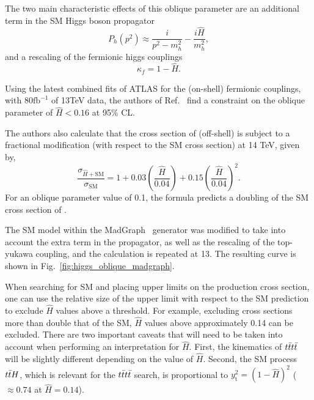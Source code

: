 The two main characteristic effects of this oblique parameter are
an additional term in the SM Higgs boson propagator
\begin{equation}
    P_h(p^2)\approx\frac{i}{p^2-m_h^2}-\frac{i\hat{H}}{m_h^2},
\end{equation}
and a rescaling of the fermionic higgs
couplings
\begin{equation}
    \kappa_f = 1-{\hat H}.
\end{equation}

Using the latest combined fits of ATLAS for the (on-shell) fermionic couplings,
with 80$\mathrm{fb}^{-1}$ of 13TeV data, the authors of Ref.~\cite{THEORY:ObliqueHiggs2019} find a constraint on
the oblique parameter of $\hat{H} < 0.16$ at 95\% CL.

The authors also calculate that the cross section of (off-shell) \tttt is subject to a fractional modification (with respect to the SM cross section)
at 14 TeV, given by,
\begin{equation}
    \frac{\sigma_{\hat{H}+\mathrm{SM}}}{\sigma_\mathrm{SM}} = 1 + 0.03\left(\frac{\hat{H}}{0.04}\right) + 0.15\left(\frac{\hat{H}}{0.04}\right)^2.
\end{equation}
For an oblique parameter value of 0.1, the formula predicts a doubling of the SM cross section of \tttt.

The SM model within the MadGraph~\cite{THEORY:MADGRAPH5} generator was modified to take into account the extra term in the propagator, as
well as the rescaling of the top-yukawa coupling, and the calculation is repeated
at 13\TeV. The resulting curve is shown in Fig.~\ref{fig:higgs_oblique_madgraph}.

When searching for SM \tttt and placing upper limits on the production cross
section, one can use the relative size of the upper limit with respect to
the SM prediction to exclude $\hat{H}$ values above a threshold. For example,
excluding cross sections more than double that of the SM, $\hat{H}$ values
above approximately 0.14 can be excluded. There are two important caveats
that will need to be taken into account when performing an interpretation for
$\hat{H}$. First, the kinematics of $t\bar{t}t\bar{t}$ will be slightly different
depending on the value of $\hat{H}$. Second, the SM process $t\bar{t} H$, which is
relevant for the $t\bar{t}t\bar{t}$ search, is proportional to
$y_\mathrm{t}^2=(1-\hat{H})^2$ ($\approx 0.74$ at $\hat{H}=0.14$).

